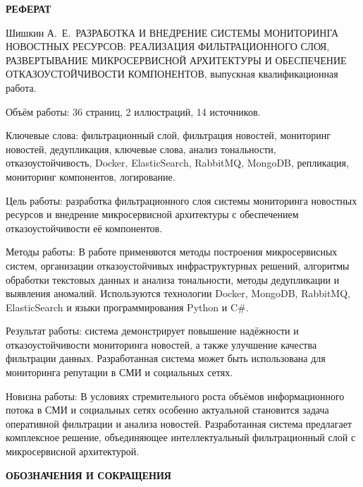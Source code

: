 \newpage
{\centering
\normal
\textbf{РЕФЕРАТ}\par
}

Шишкин А.\ Е.\ РАЗРАБОТКА И ВНЕДРЕНИЕ СИСТЕМЫ МОНИТОРИНГА НОВОСТНЫХ РЕСУРСОВ: РЕАЛИЗАЦИЯ ФИЛЬТРАЦИОННОГО СЛОЯ, РАЗВЕРТЫВАНИЕ МИКРОСЕРВИСНОЙ АРХИТЕКТУРЫ И ОБЕСПЕЧЕНИЕ ОТКАЗОУСТОЙЧИВОСТИ КОМПОНЕНТОВ, выпускная квалификационная работа.

Объём работы: 36 страниц, 2 иллюстраций, 14 источников.

Ключевые слова: фильтрационный слой, фильтрация новостей, мониторинг новостей, дедупликация, ключевые слова, анализ тональности, отказоустойчивость, Docker, ElasticSearch, RabbitMQ, MongoDB, репликация, мониторинг компонентов, логирование.

Цель работы: разработка фильтрационного слоя системы мониторинга новостных ресурсов и внедрение микросервисной архитектуры с обеспечением отказоустойчивости её компонентов.

Методы работы: В работе применяются методы построения микросервисных систем, организации отказоустойчивых инфраструктурных решений, алгоритмы обработки текстовых данных и анализа тональности, методы дедупликации и выявления аномалий.
Используются технологии Docker, MongoDB, RabbitMQ, ElasticSearch и языки программирования Python и C\#.

Результат работы: система демонстрирует повышение надёжности и отказоустойчивости мониторинга новостей, а также улучшение качества фильтрации данных.
Разработанная система может быть использована для мониторинга репутации в СМИ и социальных сетях.

Новизна работы: В условиях стремительного роста объёмов информационного потока в СМИ и социальных сетях особенно актуальной становится задача оперативной фильтрации и анализа новостей.
Разработанная система предлагает комплексное решение, объединяющее интеллектуальный фильтрационный слой с микросервисной архитектурой.

\setcounter{page}{2}

\newpage
\renewcommand{\contentsname}{\centerline{\normal СОДЕРЖАНИЕ}}
\begin{spacing}{1.5}
\tableofcontents
\end{spacing}

\newpage
{\centering
\normal
\textbf{ОБОЗНАЧЕНИЯ И СОКРАЩЕНИЯ}\par
}

